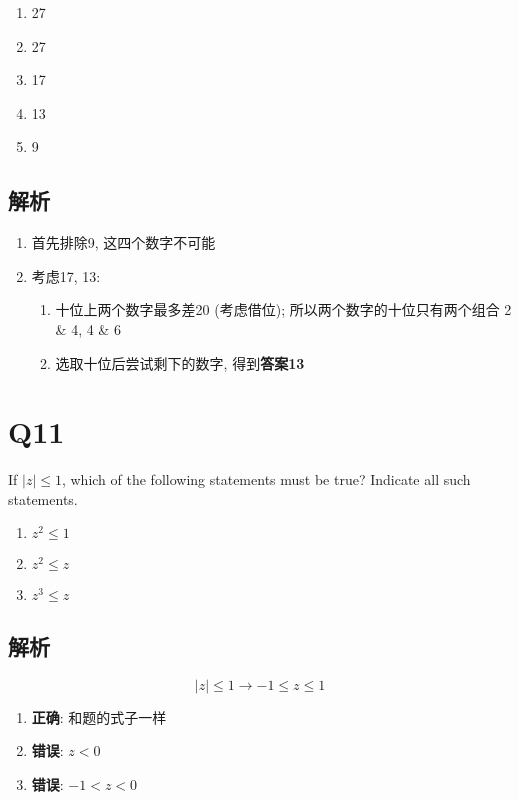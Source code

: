   \begin{enumerate}
    \item 27
    \item 27
    \item 17
    \item 13
    \item 9
  \end{enumerate}

  \subsection{解析}

    \begin{enumerate}
      \item 首先排除9, 这四个数字不可能
      \item 考虑17, 13:
      \begin{enumerate}
        \item 十位上两个数字最多差20 (考虑借位); 所以两个数字的十位只有两个组合
        2 \& 4, 4 \& 6
        \item 选取十位后尝试剩下的数字, 得到\textbf{答案13}
      \end{enumerate}
    \end{enumerate}

\section{Q11}

  If $ \left| z \right| \le 1 $, which of the following statements must be
  true? Indicate all such statements.

  \begin{enumerate}
    \item $ z^{2} \le 1 $
    \item $ z^{2} \le z $
    \item $ z^{3} \le z $
  \end{enumerate}

  \subsection{解析}

    \begin{equation*}
      \left| z \right| \le 1 \to -1 \le z \le 1
    \end{equation*}

    \begin{enumerate}
      \item \textbf{正确}: 和题的式子一样
      \item \textbf{错误}: $ z < 0 $
      \item \textbf{错误}: $ -1 < z < 0 $
    \end{enumerate}

